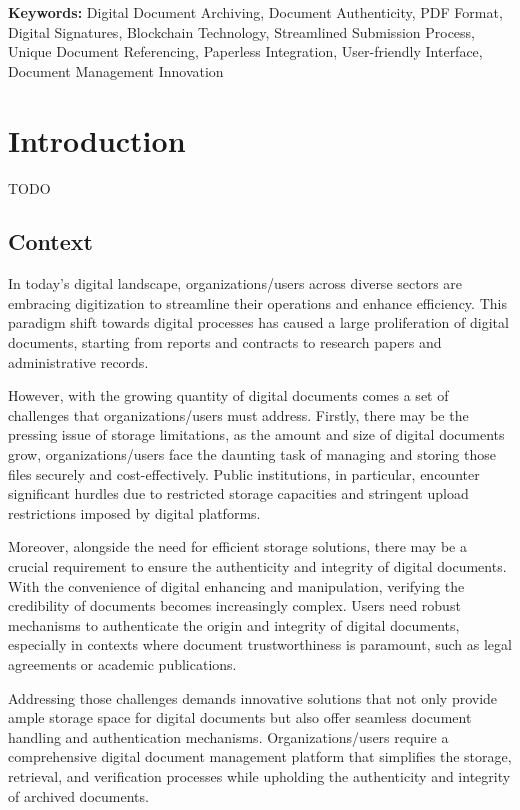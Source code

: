 \documentclass[a4paper,11pt]{article}
\begin{document}
        \vspace{3.0cm}
        \textbf{Keywords:} Digital Document Archiving, Document Authenticity, PDF Format, Digital Signatures, Blockchain Technology, Streamlined Submission Process, Unique Document Referencing, Paperless Integration, User-friendly Interface, Document Management Innovation

    \clearpage %
    \tableofcontents
    \clearpage %

    \section{Introduction}\label{sec:intro}
        TODO
    
    \vspace{0.5cm}
    \subsection{Context}
        In today's digital landscape, organizations/users across diverse sectors are embracing digitization to streamline their operations and enhance efficiency. This paradigm shift towards digital processes has caused a large proliferation of digital documents, starting from reports and contracts to research papers and administrative records.
        
        However, with the growing quantity of digital documents comes a set of challenges that organizations/users must address. Firstly, there may be the pressing issue of storage limitations, as the amount and size of digital documents grow, organizations/users face the daunting task of managing and storing those files securely and cost-effectively. Public institutions, in particular, encounter significant hurdles due to restricted storage capacities and stringent upload restrictions imposed by digital platforms.
        
        Moreover, alongside the need for efficient storage solutions, there may be a crucial requirement to ensure the authenticity and integrity of digital documents. With the convenience of digital enhancing and manipulation, verifying the credibility of documents becomes increasingly complex. Users need robust mechanisms to authenticate the origin and integrity of digital documents, especially in contexts where document trustworthiness is paramount, such as legal agreements or academic publications.
        
        Addressing those challenges demands innovative solutions that not only provide ample storage space for digital documents but also offer seamless document handling and authentication mechanisms. Organizations/users require a comprehensive digital document management platform that simplifies the storage, retrieval, and verification processes while upholding the authenticity and integrity of archived documents.
        
\end{document}
